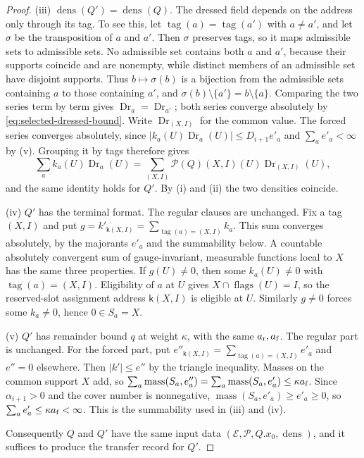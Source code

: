 \begin{proof}
(iii) $\operatorname{dens}(Q')=\operatorname{dens}(Q)$. The dressed
field depends on the address only through its tag. To see this, let
$\operatorname{tag}(a)=\operatorname{tag}(a')$ with $a\ne a'$, and let
$\sigma$ be the transposition of $a$ and $a'$. Then $\sigma$ preserves
tags, so it maps admissible sets to admissible sets. No admissible set
contains both $a$ and $a'$, because their supports coincide and are
nonempty, while distinct members of an admissible set have disjoint
supports. Thus $b\mapsto\sigma(b)$ is a bijection from the admissible
sets containing $a$ to those containing $a'$, and
$\sigma(b)\setminus\{a'\}=b\setminus\{a\}$. Comparing the two series
term by term gives $\operatorname{Dr}_a=\operatorname{Dr}_{a'}$; both
series converge absolutely by \eqref{eq:selected-dressed-bound}. Write
$\operatorname{Dr}_{(X,I)}$ for the common value. The forced series
converges absolutely, since
$|k_a(U)\operatorname{Dr}_a(U)|\le D_{i+1}e'_a$ and
$\sum_ae'_a<\infty$ by (v). Grouping it by tags therefore gives
\[
 \sum_ak_a(U)\operatorname{Dr}_a(U)
 =\sum_{(X,I)}\mathcal P(Q)(X,I)(U)\operatorname{Dr}_{(X,I)}(U),
\]
and the same identity holds for $Q'$. By (i) and (ii) the two
densities coincide.

(iv) $Q'$ has the terminal format. The regular clauses are unchanged.
Fix a tag $(X,I)$ and put $g=k'_{\mathsf k(X,I)}=\sum_{\operatorname{tag}(a)=(X,I)}k_a$.
This sum converges absolutely, by the majorants $e'_a$ and the
summability below. A countable absolutely convergent sum of
gauge-invariant, measurable functions local to $X$ has the same three
properties. If $g(U)\ne0$, then some $k_a(U)\ne0$ with
$\operatorname{tag}(a)=(X,I)$. Eligibility of $a$ at $U$ gives
$X\cap\operatorname{flags}(U)=I$, so the reserved-slot assignment address $\mathsf k(X,I)$
is eligible at $U$. Similarly $g\ne0$ forces some $k_a\ne0$, hence
$0\in S_a=X$.

(v) $Q'$ has remainder bound $q$ at weight $\kappa$, with the same
$a_{\rm r},a_{\rm f}$. The regular part is unchanged. For the forced
part, put $e''_{\mathsf k(X,I)}=\sum_{\operatorname{tag}(a)=(X,I)}e'_a$
and $e''=0$ elsewhere. Then $|k'|\le e''$ by the triangle inequality.
Masses on the common support $X$ add, so
$\sum_a\operatorname{mass}(S_a,e''_a)=\sum_a\operatorname{mass}(S_a,e'_a)\le\kappa a_{\rm f}$.
Since $\alpha_{i+1}>0$ and the cover number is nonnegative,
$\operatorname{mass}(S_a,e'_a)\ge e'_a\ge0$, so
$\sum_ae'_a\le\kappa a_{\rm f}<\infty$. This is the summability used
in (iii) and (iv).

Consequently $Q$ and $Q'$ have the same input data
$(\mathcal E,\mathcal P,Q.x_0,\operatorname{dens})$, and it suffices to
produce the transfer record for $Q'$.


\end{proof}
